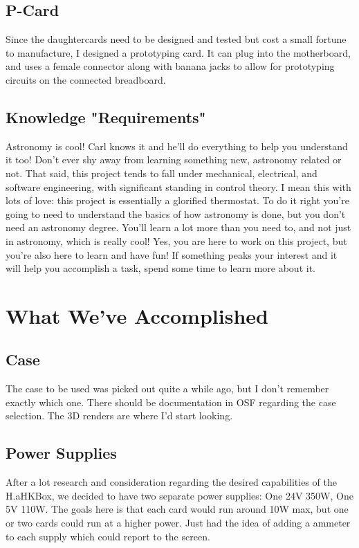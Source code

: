 \documentclass[prb,preprint]{revtex4-1}
\begin{document}
\subsection{P-Card}
Since the daughtercards need to be designed and tested but cost a small fortune to manufacture, I designed a prototyping card. It can plug into the motherboard, and uses a female connector along with banana jacks to allow for prototyping circuits on the connected breadboard.

\subsection{Knowledge "Requirements"}
Astronomy is cool! Carl knows it and he'll do everything to help you understand it too! Don't ever shy away from learning something new, astronomy related or not. That said, this project tends to fall under mechanical, electrical, and software engineering, with significant standing in control theory. I mean this with lots of love: this project is essentially a glorified thermostat. To do it right you're going to need to understand the basics of how astronomy is done, but you don't need an astronomy degree. You'll learn a lot more than you need to, and not just in astronomy, which is really cool! Yes, you are here to work on this project, but you're also here to learn and have fun! If something peaks your interest and it will help you accomplish a task, spend some time to learn more about it.

\section{What We've Accomplished}
\subsection{Case}
The case to be used was picked out quite a while ago, but I don't remember exactly which one. There should be documentation in OSF regarding the case selection. The 3D renders are where I'd start looking.

\subsection{Power Supplies}
After a lot research and consideration regarding the desired capabilities of the H.aHKBox, we decided to have two separate power supplies: One 24V 350W, One 5V 110W. The goals here is that each card would run around 10W max, but one or two cards could run at a higher power. Just had the idea of adding a ammeter to each supply which could report to the screen.
\end{document}
